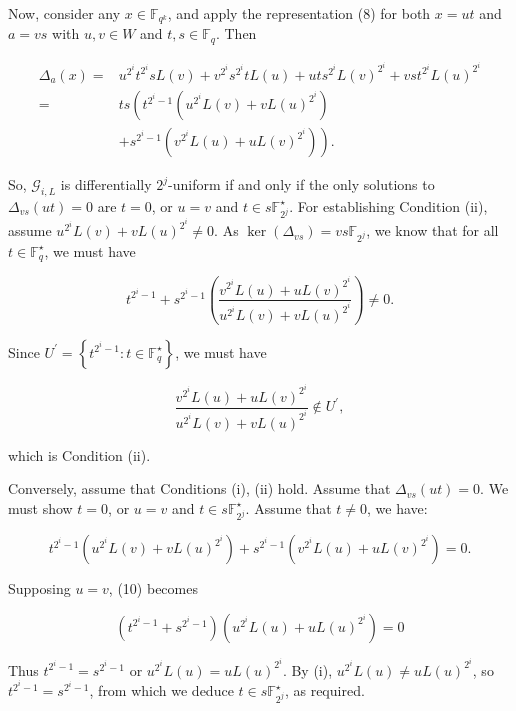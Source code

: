 \documentclass[10pt]{article}
\begin{document}
Now, consider any $x \in \mathbb{F}_{q^{k}}$, and apply the representation (8) for both $x=u t$ and $a=v s$ with $u, v \in W$ and $t, s \in \mathbb{F}_{q}$. Then

$$
\begin{aligned}
\Delta_{a}(x)= & u^{2^{i}} t^{2^{i}} s L(v)+v^{2^{i}} s^{2^{i}} t L(u)+u t s^{2^{i}} L(v)^{2^{i}}+v s t^{2^{i}} L(u)^{2^{i}} \\
= & t s\left(t^{2^{i}-1}\left(u^{2^{i}} L(v)+v L(u)^{2^{i}}\right)\right. \\
& \left.+s^{2^{i}-1}\left(v^{2^{i}} L(u)+u L(v)^{2^{i}}\right)\right) .
\end{aligned}
$$

So, $\mathcal{G}_{i, L}$ is differentially $2^{j}$-uniform if and only if the only solutions to $\Delta_{v s}(u t)=0$ are $t=0$, or $u=v$ and $t \in s \mathbb{F}_{2^{j}}^{\star}$. For establishing Condition (ii), assume $u^{2^{i}} L(v)+v L(u)^{2^{i}} \neq 0$. As $\operatorname{ker}\left(\Delta_{v s}\right)=v s \mathbb{F}_{2^{j}}$, we know that for all $t \in \mathbb{F}_{q}^{\star}$, we must have

$$
t^{2^{i}-1}+s^{2^{i}-1}\left(\frac{v^{2^{i}} L(u)+u L(v)^{2^{i}}}{u^{2^{i}} L(v)+v L(u)^{2^{i}}}\right) \neq 0 .
$$

Since $U^{\prime}=\left\{t^{2^{i}-1}: t \in \mathbb{F}_{q}^{\star}\right\}$, we must have

$$
\frac{v^{2^{i}} L(u)+u L(v)^{2^{i}}}{u^{2^{i}} L(v)+v L(u)^{2^{i}}} \notin U^{\prime},
$$

which is Condition (ii).

Conversely, assume that Conditions (i), (ii) hold. Assume that $\Delta_{v s}(u t)=0$. We must show $t=0$, or $u=v$ and $t \in s \mathbb{F}_{2^{j}}^{\star}$. Assume that $t \neq 0$, we have:


\begin{equation*}
t^{2^{i}-1}\left(u^{2^{i}} L(v)+v L(u)^{2^{i}}\right)+s^{2^{i}-1}\left(v^{2^{i}} L(u)+u L(v)^{2^{i}}\right)=0 . \tag{10}
\end{equation*}


Supposing $u=v$, (10) becomes

$$
\left(t^{2^{i}-1}+s^{2^{i}-1}\right)\left(u^{2^{i}} L(u)+u L(u)^{2^{i}}\right)=0
$$

Thus $t^{2^{i}-1}=s^{2^{i}-1}$ or $u^{2^{i}} L(u)=u L(u)^{2^{i}}$. By (i), $u^{2^{i}} L(u) \neq u L(u)^{2^{i}}$, so $t^{2^{i}-1}=s^{2^{i}-1}$, from which we deduce $t \in s \mathbb{F}_{2^{j}}^{\star}$, as required.
\end{document}
